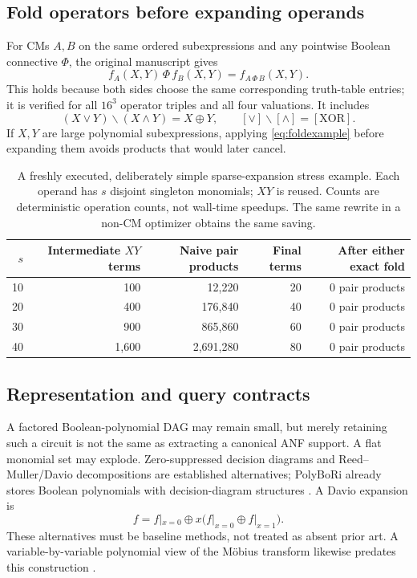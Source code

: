 \subsection{Fold operators before expanding operands}
For CMs $A,B$ on the same ordered subexpressions and any pointwise Boolean connective $\Phi$, the original manuscript gives
\begin{equation}\label{eq:fold}
 f_A(X,Y)\,\Phi\,f_B(X,Y)=f_{A\,\Phi\,B}(X,Y).
\end{equation}
This holds because both sides choose the same corresponding truth-table entries; it is verified for all $16^3$ operator triples and all four valuations. It includes
\begin{equation}\label{eq:foldexample}
 (X\lor Y)\backslash(X\land Y)=X\oplus Y,
 \qquad[\lor]\backslash[\land]=[\mathrm{XOR}].
\end{equation}
If $X,Y$ are large polynomial subexpressions, applying \cref{eq:foldexample} before expanding them avoids products that would later cancel.

\begin{table}[htbp]\centering\small
\begin{tabular}{@{}rrrrr@{}}\toprule
$s$ & Intermediate $XY$ terms & Naive pair products & Final terms & After either exact fold\\\midrule
10 & 100 & 12,220 & 20 & 0 pair products\\
20 & 400 & 176,840 & 40 & 0 pair products\\
30 & 900 & 865,860 & 60 & 0 pair products\\
40 & 1,600 & 2,691,280 & 80 & 0 pair products\\\bottomrule
\end{tabular}
\caption{A freshly executed, deliberately simple sparse-expansion stress example. Each operand has $s$ disjoint singleton monomials; $XY$ is reused. Counts are deterministic operation counts, not wall-time speedups. The same rewrite in a non-CM optimizer obtains the same saving.}
\label{tab:foldcost}
\end{table}

\subsection{Representation and query contracts}
A factored Boolean-polynomial DAG may remain small, but merely retaining such a circuit is not the same as extracting a canonical ANF support. A flat monomial set may explode. Zero-suppressed decision diagrams and Reed--Muller/Davio decompositions are established alternatives; PolyBoRi already stores Boolean polynomials with decision-diagram structures \cite{polybori,polyboridoc}. A Davio expansion is
\begin{equation}
 f=f|_{x=0}\oplus x\big(f|_{x=0}\oplus f|_{x=1}\big).
\end{equation}
These alternatives must be baseline methods, not treated as absent prior art. A variable-by-variable polynomial view of the M\"obius transform likewise predates this construction \cite{barbier}.

